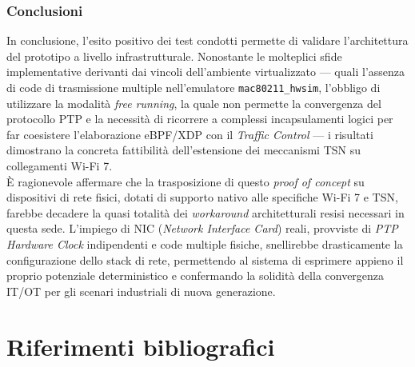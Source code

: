 \documentclass[12pt,a4paper,twoside]{book}
\newcommand{\hwsim}{\mbox{\texttt{mac80211\_hwsim}}\xspace}
\begin{document}
\begin{onehalfspace}
\subsection{Conclusioni}
In conclusione, l'esito positivo dei test condotti permette di validare l'architettura del prototipo a livello infrastrutturale. Nonostante le molteplici sfide implementative derivanti dai vincoli dell'ambiente virtualizzato --- quali l'assenza di code di trasmissione multiple nell'emulatore \hwsim, l'obbligo di utilizzare la modalità \textit{free running}, la quale non permette la convergenza del protocollo PTP e la necessità di ricorrere a complessi incapsulamenti logici per far coesistere l'elaborazione eBPF/XDP con il \textit{Traffic Control} --- i risultati dimostrano la concreta fattibilità dell'estensione dei meccanismi TSN su collegamenti Wi-Fi 7.
\\
È ragionevole affermare che la trasposizione di questo \textit{proof of concept} su dispositivi di rete fisici, dotati di supporto nativo alle specifiche Wi-Fi 7 e TSN, farebbe decadere la quasi totalità dei \textit{workaround} architetturali resisi necessari in questa sede. L'impiego di NIC (\textit{Network Interface Card}) reali, provviste di \textit{PTP Hardware Clock} indipendenti e code multiple fisiche, snellirebbe drasticamente la configurazione dello stack di rete, permettendo al sistema di esprimere appieno il proprio potenziale deterministico e confermando la solidità della convergenza IT/OT per gli scenari industriali di nuova generazione.

\end{onehalfspace}
\chapter*{Riferimenti bibliografici}
\printbibliography[heading=none]
\end{document}
